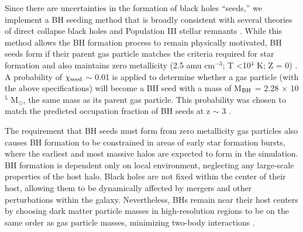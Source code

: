 \documentclass[manuscript]{aastex}
\begin{document}
Since there are uncertainties in the formation of black holes ``seeds,'' we implement a BH seeding method that is broadly consistent with several theories of direct collapse black holes \citep{Couchman1986, Abel2002, Bromm2004} and Population III stellar remnants \citep{Loeb1994, Eisenstein1995, Koushiappas2004, Begelman2006, Lodato2006}. While this method allows the BH formation process to remain physically motivated, BH seeds form if their parent gas particle matches the criteria required for star formation and also maintains zero metallicity (2.5 amu cm$^{-3}$; T \textless 10$^4$ K; Z = 0) \citep{Stinson2006}. A probability of $\chi_{\rm seed}$ $\sim$ 0.01 is applied to determine whether a gas particle (with the above specifications) will become a BH seed with a mass of M$_{\rm BH}$ = 2.28 $\times$ 10$^5$ M$_{\odot}$, the same mass as its parent gas particle. This probability was chosen to match the predicted occupation fraction of BH seeds at z $\sim$ 3 \citep{Volonteri2008}.

The requirement that BH seeds must form from zero metallicity gas particles also causes BH formation to be constrained in areas of early star formation bursts, where the earliest and most massive halos are expected to form in the simulation. BH formation is dependent only on local environment, neglecting any large-scale properties of the host halo. Black holes are not fixed within the center of their host, allowing them to be dynamically affected by mergers and other perturbations within the galaxy. Nevertheless, BHs remain near their host centers by choosing dark matter particle masses in high-resolution regions to be on the same order as gas particle masses, minimizing two-body interactions \citep{Bellovary2011}.
\end{document}
